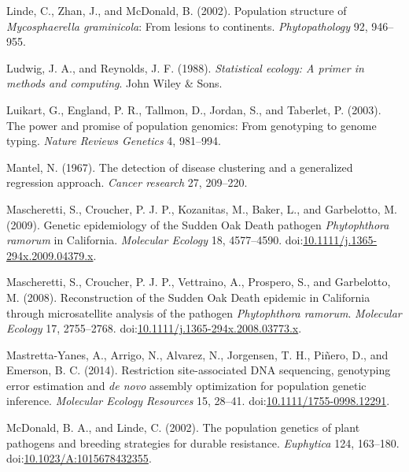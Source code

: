 \documentclass[double,12pt]{beavtex}
\begin{document}
  \hypertarget{ref-linde2002population}{}
  Linde, C., Zhan, J., and McDonald, B. (2002). Population structure of
  \emph{Mycosphaerella graminicola}: From lesions to continents.
  \emph{Phytopathology} 92, 946--955.
  
  \hypertarget{ref-ludwig1988statistical}{}
  Ludwig, J. A., and Reynolds, J. F. (1988). \emph{Statistical ecology: A
  primer in methods and computing}. John Wiley \& Sons.
  
  \hypertarget{ref-luikart2003power}{}
  Luikart, G., England, P. R., Tallmon, D., Jordan, S., and Taberlet, P.
  (2003). The power and promise of population genomics: From genotyping to
  genome typing. \emph{Nature Reviews Genetics} 4, 981--994.
  
  \hypertarget{ref-mantel1967detection}{}
  Mantel, N. (1967). The detection of disease clustering and a generalized
  regression approach. \emph{Cancer research} 27, 209--220.
  
  \hypertarget{ref-mascheretti2009genetic}{}
  Mascheretti, S., Croucher, P. J. P., Kozanitas, M., Baker, L., and
  Garbelotto, M. (2009). Genetic epidemiology of the Sudden Oak Death
  pathogen \emph{Phytophthora ramorum} in California. \emph{Molecular
  Ecology} 18, 4577--4590.
  doi:\href{https://doi.org/10.1111/j.1365-294x.2009.04379.x}{10.1111/j.1365-294x.2009.04379.x}.
  
  \hypertarget{ref-mascheretti2008reconstruction}{}
  Mascheretti, S., Croucher, P. J. P., Vettraino, A., Prospero, S., and
  Garbelotto, M. (2008). Reconstruction of the Sudden Oak Death epidemic
  in California through microsatellite analysis of the pathogen
  \emph{Phytophthora ramorum}. \emph{Molecular Ecology} 17, 2755--2768.
  doi:\href{https://doi.org/10.1111/j.1365-294x.2008.03773.x}{10.1111/j.1365-294x.2008.03773.x}.
  
  \hypertarget{ref-mastretta2015restriction}{}
  Mastretta-Yanes, A., Arrigo, N., Alvarez, N., Jorgensen, T. H., Piñero,
  D., and Emerson, B. C. (2014). Restriction site-associated DNA
  sequencing, genotyping error estimation and \emph{de novo} assembly
  optimization for population genetic inference. \emph{Molecular Ecology
  Resources} 15, 28--41.
  doi:\href{https://doi.org/10.1111/1755-0998.12291}{10.1111/1755-0998.12291}.
  
  \hypertarget{ref-Mcdonald2002}{}
  McDonald, B. A., and Linde, C. (2002). The population genetics of plant
  pathogens and breeding strategies for durable resistance.
  \emph{Euphytica} 124, 163--180.
  doi:\href{https://doi.org/10.1023/A:1015678432355}{10.1023/A:1015678432355}.
  
\end{document}
